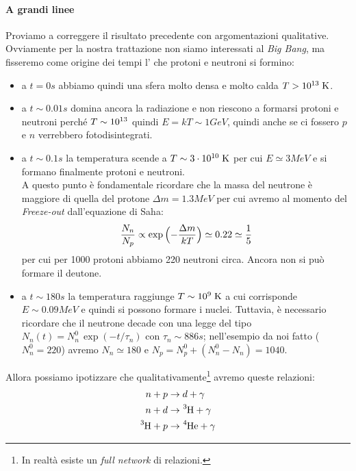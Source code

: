 \paragraph{A grandi linee}\label{a.grandi.linee} Proviamo a correggere il risultato precedente con argomentazioni qualitative. Ovviamente per la nostra trattazione non siamo interessati al \textit{Big Bang}, ma fisseremo come origine dei tempi l' che protoni e neutroni si formino: 
\begin{itemize}
    \item a $t=0\unit{s}$ abbiamo quindi una sfera molto densa e molto calda $T>10^{13}\;\mbox{K}$.  
    \item a $t\sim 0.01\unit{s}$ domina ancora la radiazione e non riescono a formarsi protoni e neutroni perché $T\sim10^{13}$ quindi $E=kT\sim 1\unit{GeV}$, quindi anche se ci fossero $p$ e $n$ verrebbero fotodisintegrati.
    \item a $t\sim 0.1\unit{s}$ la temperatura scende a $T\sim 3\cdot10^{10}\;\mbox{K}$ per cui $E\simeq 3\unit{MeV}$ e si formano finalmente protoni e neutroni.\\ 
    A questo punto è fondamentale ricordare che la massa del neutrone è maggiore di quella del protone $\Delta m = 1.3\unit{MeV}$ per cui avremo al momento del \textit{Freeze-out} dall'equazione di Saha:
    $$\frac{N_n}{N_p}\propto \exp{\Bigl ( -\frac{\Delta m}{kT} \Bigr )} \simeq 0.22 \simeq \frac{1}{5}$$
    per cui per 1000 protoni abbiamo 220 neutroni circa. Ancora non si può formare il deutone.
    \item a $t\sim 180\unit{s}$ la temperatura raggiunge $T\sim 10^{9}\;\mbox{K}$ a cui corrisponde $E\sim 0.09\unit{MeV}$ e quindi si possono formare i nuclei. Tuttavia, è necessario ricordare che il neutrone decade con una legge del tipo $N_n(t) = N_n^0 \, \exp{(-t/\tau_n)}$ con $\tau_n \sim 886\unit{s}$; nell'esempio da noi fatto ($N_n^0= 220$) avremo $N_n \simeq 180$ e $N_p = N_p^0 + (N_n^0-N_n) = 1040$.
\end{itemize}
\noindent Allora possiamo ipotizzare che qualitativamente\footnote{In realtà esiste un \textit{full network} di relazioni.} avremo queste relazioni:
\begin{displaymath}
\begin{aligned}
n + p &\to d + \gamma \\
n + d &\to \ce{^3H} + \gamma \\
\ce{^3H} + p &\to \ce{^4He} + \gamma
\end{aligned}
\end{displaymath}
